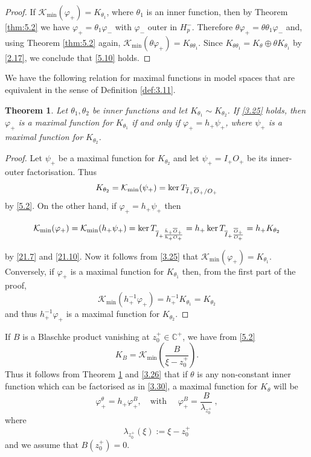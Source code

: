 \documentclass[11pt]{article}
\def\ker{\mathop{\rm ker}\nolimits}
\renewcommand\phi{\varphi}
\newtheorem{thm}{Theorem}[section]
\numberwithin{equation}{section}
\def\beginpf{\begin{proof}}
\def\endpf{\end{proof}}
\def\beq{\begin{equation}}
\def\eeq{\end{equation}}
\begin{document}
\beginpf If $\mathcal{K}_{\min}(\phi_+)=K_{\theta_1}$, where $\theta_1$ is an inner function, then by Theorem \ref{thm:5.2} we have $\phi_+=\theta_1\phi_-$ with $\phi_-$ outer in $H_p^-$. Therefore $\theta\phi_+=\theta\theta_1\phi_-$ and, using Theorem \ref{thm:5.2} again, $\mathcal{K}_{\min}(\theta\phi_+)=K_{\theta\theta_1}$. Since $K_{\theta\theta_1}=K_\theta \oplus \theta K_{\theta_1}$ by \eqref{2.17}, we conclude that \eqref{5.10} holds.
\endpf


We have the following relation for maximal functions in model spaces that are equivalent in the sense of Definition \ref {def:3.11}.




\begin{thm}\label{thm:5.3} Let $\theta_1, \theta_2$ be inner functions and let $K_{\theta_1} \sim K_{\theta_2}$. If \eqref {3.25} holds, then $\phi_+$ is a maximal function for $K_{\theta_1}$ if and only if $\phi_+=h_+\psi_+$, where $\psi_+$ is a maximal function for $K_{\theta_2}$.
\end{thm}


\beginpf Let $\psi_+$ be a maximal function for $K_{\theta_2}$ and let $\psi_+=I_+O_+$ be its inner-outer factorisation. Thus
\[K_{\theta_2}=\mathcal{K}_{\min}(\psi_+)=\ker T_{\overline{I}_+\overline{O}_+/O_+}\]
by \eqref{5.2}. On the other hand, if $\phi_+=h_+\psi_+$ then

\[\mathcal{K}_{\min}(\phi_+) =\mathcal{K}_{\min}(h_+\psi_+) = \ker T_{\overline{I}_+\frac{\bar{h}_+\overline{O}_+}{h_+O_+}} = h_+\ker T_{\overline{I}_+\frac{\overline{O}_+}{O_+}}= h_+K_{\theta_2}\]

by \eqref{21.7} and \eqref{21.10}. Now it follows from \eqref{3.25} that $\mathcal{K}_{\min}(\phi_+) =K_{\theta_1}$. Conversely, if $\phi_+$ is a maximal function for $K_{\theta_1}$ then, from the first part of the proof,
\[\mathcal{K}_{\min}(h_+^{-1}\phi_+)=h_+^{-1}K_{\theta_1}=K_{\theta_2}  \]
and thus $h_+^{-1}\phi_+$ is a maximal function for $K_{\theta_2}$.
\endpf

If $B$ is a Blaschke product vanishing at $z_0^+ \in \mathbb{C}^+$, we have from \eqref{5.2}
\begin{equation}\label{5.6}
K_B=\mathcal{K}_{\min} \left( \frac{B}{\xi-z_0^+} \right).
\end{equation}
Thus it follows from Theorem \ref{thm:5.3} and \eqref {3.26} that if $\theta$ is any non-constant inner function which can be factorised as in \eqref{3.30}, a maximal function for $K_\theta$ will be
\beq\label{5.7}
\phi_+^\theta=h_+\phi_+^B, \quad \text{with } \quad \phi_+^B=\frac{B}{\lambda_{z_0^+}}\ ,
\eeq
where
\beq\label{5.7A}
\lambda_{z_0^+}(\xi):=\xi-z_0^+
\eeq
and we assume that $B(z_0^+)=0$.\\
\end{document}
